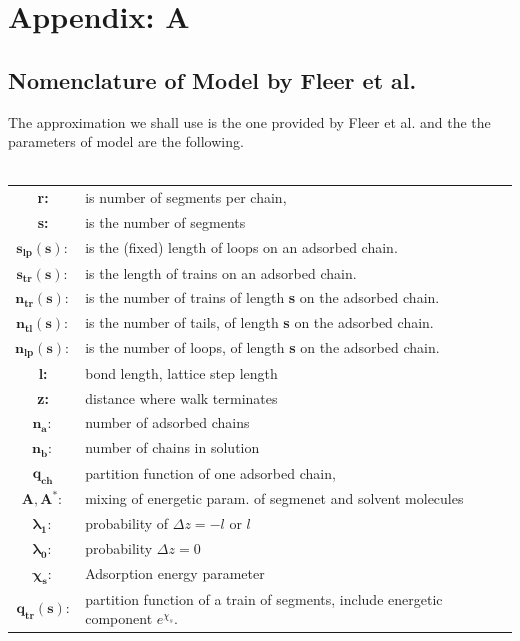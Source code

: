 \documentclass[10pt,letterpaper]{article}
\begin{document}
 






\newpage
\section{Appendix: A}


\subsection{Nomenclature of Model by Fleer et al.}
The approximation we shall use is the one provided by Fleer et al.\cite{fleer1993polymers} and the the parameters of model are the following.\\\\
%
\begin{tabular}{c|l}
\hline
\textbf{r:} & is number of segments per chain,\\
\textbf{s:} & is the number of segments \\ 
$\mathbf{s_{lp}(s):}$ &is the (fixed) length of loops on an adsorbed chain.\\
$\mathbf{s_{tr}(s):}$ &is the length of trains on an adsorbed chain.\\
$\mathbf{n_{tr}(s):}$ & is the number of trains of length \textbf{s}  on the adsorbed chain.\\
$\mathbf{n_{tl}(s):}$ &is the number of tails, of length \textbf{s}  on the adsorbed chain.\\
$\mathbf{n_{lp}(s):}$ &is the number of loops, of length \textbf{s}  on the adsorbed chain.\\
\textbf{l:}&bond length, lattice step length\\
\textbf{z:}&distance where walk terminates\\
$\mathbf{n_a:}$ &number of adsorbed chains\\
$\mathbf{n_b:}$&number of chains in solution\\
$\mathbf{q_{ch}}$&partition function of one adsorbed chain,\\
$\mathbf{A,A^{*}:}$& mixing of energetic param. of segmenet and solvent molecules\footnotemark \\
$\mathbf{\lambda_1:}$&probability of $\Delta z=-l$ or $l$\\
$\mathbf{\lambda_0:}$ &probability $\Delta z=0$\\
$\mathbf{\chi_{s}:}$ &Adsorption energy parameter\\
$\mathbf{q_{tr}(s)}$: & partition function of a train of segments, include energetic component $e^{\chi_s}$.\\

\end{tabular}
\end{document}
